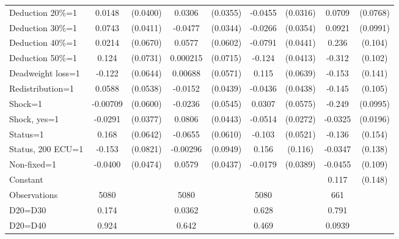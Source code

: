 \begin{tabular}{l|cccccc|cc}
Deduction 20\%=1&   0.0148         & (0.0400)&   0.0306         & (0.0355)&  -0.0455         & (0.0316)&   0.0709         & (0.0768)\\
Deduction 30\%=1&   0.0743\sym{*}  & (0.0411)&  -0.0477         & (0.0344)&  -0.0266         & (0.0354)&   0.0921         & (0.0991)\\
Deduction 40\%=1&   0.0214         & (0.0670)&   0.0577         & (0.0602)&  -0.0791\sym{*}  & (0.0441)&    0.236\sym{**} &  (0.104)\\
Deduction 50\%=1&    0.124\sym{*}  & (0.0731)& 0.000215         & (0.0715)&   -0.124\sym{***}& (0.0413)&   -0.312\sym{***}&  (0.102)\\
Deadweight loss=1&   -0.122\sym{*}  & (0.0644)&  0.00688         & (0.0571)&    0.115\sym{*}  & (0.0639)&   -0.153         &  (0.141)\\
Redistribution=1&   0.0588         & (0.0538)&  -0.0152         & (0.0439)&  -0.0436         & (0.0438)&   -0.145         &  (0.105)\\
Shock=1         & -0.00709         & (0.0600)&  -0.0236         & (0.0545)&   0.0307         & (0.0575)&   -0.249\sym{**} & (0.0995)\\
Shock, yes=1    &  -0.0291         & (0.0377)&   0.0806\sym{*}  & (0.0443)&  -0.0514\sym{*}  & (0.0272)&  -0.0325         & (0.0196)\\
Status=1        &    0.168\sym{***}& (0.0642)&  -0.0655         & (0.0610)&   -0.103\sym{**} & (0.0521)&   -0.136         &  (0.154)\\
Status, 200 ECU=1&   -0.153\sym{*}  & (0.0821)& -0.00296         & (0.0949)&    0.156         &  (0.116)&  -0.0347         &  (0.138)\\
Non-fixed=1     &  -0.0400         & (0.0474)&   0.0579         & (0.0437)&  -0.0179         & (0.0389)&  -0.0455         &  (0.109)\\
Constant        &                  &         &                  &         &                  &         &    0.117         &  (0.148)\\
\hline
Observations    &     5080         &         &     5080         &         &     5080         &         &      661         &         \\
D20=D30         &    0.174         &         &   0.0362         &         &    0.628         &         &    0.791         &         \\
D20=D40         &    0.924         &         &    0.642         &         &    0.469         &         &   0.0939         &         \\

\end{tabular}
